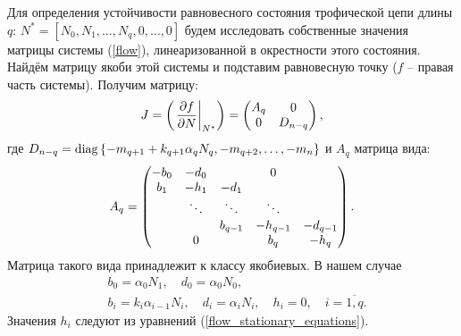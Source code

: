     Для определения устойчивости равновесного состояния трофической цепи длины \(q\): \(N^* = [ N_0, N_1, \dots, N_q, 0, \dots, 0 ]\) будем исследовать собственные значения матрицы системы (\ref{flow}), линеаризованной в окрестности этого состояния. Найдём матрицу якоби этой системы и подставим равновесную точку (\(f\) -- правая часть системы). Получим матрицу:
    \begin{equation} \label{flow_jacobian_small}
        J = \left(  \left.\frac{\partial f}{\partial N}\right|_{N^*}  \right) = \left(  \begin{matrix}
            A_q & 0 \\
            0 & D_{n-q}
        \end{matrix}  \right),
    \end{equation}
    где \(D_{n-q} = \operatorname{diag}\left\{ -m_{q+1} + k_{q+1} \alpha_q N_q, -m_{q+2}, \ldots, -m_{n} \right\}\) и \(A_q\) матрица вида:
    \begin{equation} \label{flow_jacobian_big}
        A_q = \left(  \begin{matrix}
                -b_0  & -d_0   &          &     0    & \\
                b_1  & -h_1   &  -d_1    &          & \\
                        & \ddots & \ddots   &  \ddots  &          \\
                        &        & b_{q-1}  & -h_{q-1} & -d_{q-1} \\
                        &   0    &          & b_{q}    & -h_{q}  
        \end{matrix}  \right).
    \end{equation}
    Матрица такого вида принадлежит к классу якобиевых. В нашем случае 
    \begin{equation} \label{flow_jacobian_vars}
        \begin{split}
            & b_0 = \alpha_0 N_1, \quad d_0 = \alpha_0 N_0, \\
            & b_i = k_i \alpha_{i-1} N_i, \quad d_i = \alpha_i N_i, \quad h_i = 0, \quad i=\overline{1,q}.
        \end{split}
    \end{equation}
    Значения \(h_i\) следуют из уравнений (\ref{flow_stationary_equations}).

